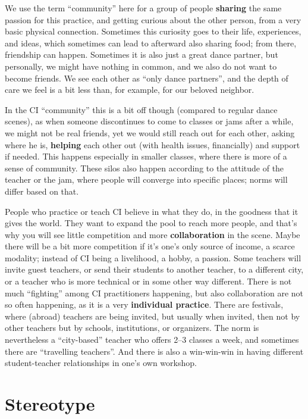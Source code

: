 We use the term ``community'' here for a group of people \textbf{sharing} the same passion for this practice, and getting curious about the other person, from a very basic physical connection.
Sometimes this curiosity goes to their life, experiences, and ideas, which sometimes can lead to afterward also sharing food; from there, friendship can happen.
Sometimes it is also just a great dance partner, but personally, we might have nothing in common, and we also do not want to become friends.
We see each other as ``only dance partners'', and the depth of care we feel is a bit less than, for example, for our beloved neighbor.

In the CI ``community'' this is a bit off though (compared to regular dance scenes), as when someone discontinues to come to classes or jams after a while, we might not be real friends, yet we would still reach out for each other, asking where he is, \textbf{helping} each other out (with health issues, financially) and support if needed.
This happens especially in smaller classes, where there is more of a sense of community.
These silos also happen according to the attitude of the teacher or the jam, where people will converge into specific places; norms will differ based on that.

People who practice or teach CI believe in what they do, in the goodness that it gives the world.
They want to expand the pool to reach more people, and that's why you will see little competition and more \textbf{collaboration} in the scene.
Maybe there will be a bit more competition if it's one's only source of income, a scarce modality; instead of CI being a livelihood, a hobby, a passion.
Some teachers will invite guest teachers, or send their students to another teacher, to a different city, or a teacher who is more technical or in some other way different.
There is not much ``fighting'' among CI practitioners happening, but also collaboration are not so often happening, as it is a very \textbf{individual practice}.
There are festivals, where (abroad) teachers are being invited, but usually when invited, then not by other teachers but by schools, institutions, or organizers.
The norm is nevertheless a ``city-based'' teacher who offers 2--3 classes a week, and sometimes there are ``travelling teachers''.
And there is also a win-win-win in having different student-teacher relationships in one's own workshop.

\section{Stereotype}\label{sec:stereotype}

